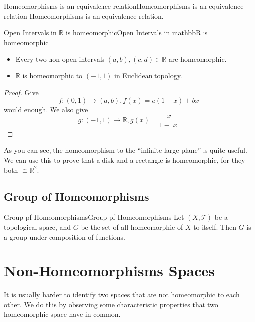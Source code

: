 \documentclass[../main.tex]{subfiles}
\begin{document}
\begin{proposition}{Homeomorphisms is an equivalence relation}{Homeomorphisms is an equivalence relation}
Homeomorphisms is an equivalence relation.
\end{proposition}

\begin{example}{Open Intervals in $\mathbb{R}$ is homeomorphic}{Open Intervals in mathbbR is homeomorphic}

\begin{itemize}
\item Every two non-open intervals $(a,b), (c,d) \in \mathbb{R}$ are homeomorphic.
\item $\mathbb{R}$ is homeomorphic to $(-1,1)$ in Euclidean topology.
\end{itemize}

\end{example}
\begin{proof}
Give
\begin{equation*}
f:(0,1) \rightarrow  (a,b), f(x) = a(1-x)+bx
\end{equation*}
would enough. We also give
\begin{equation*}
g:(-1,1) \rightarrow \mathbb{R}, g(x) = \frac{x}{1-\left|x\right|}
\end{equation*}
\end{proof}

As you can see, the homeomorphism to the ``infinite large plane'' is quite useful. We can use this to prove that a disk and a rectangle is homeomorphic, for they both $\cong \mathbb{R}^2$.

\subsection{Group of Homeomorphisms}
\begin{definition}{Group pf Homeomorphisms}{Group pf Homeomorphisms}
Let $(X,\mathcal{T})$ be a topological space, and $G$ be the set of all homeomorphic of $X$ to itself. Then $G$ is a group under composition of functions.
\end{definition}

\section{Non-Homeomorphisms Spaces}
It is usually harder to identify two spaces that are not homeomorphic to each other. We do this by observing some characteristic properties that two homeomorphic space have in common.
\end{document}
